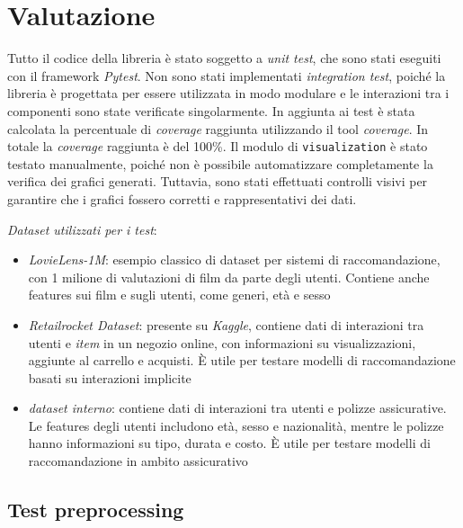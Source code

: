 \chapter{Valutazione}

Tutto il codice della libreria è stato soggetto a \textit{unit test}, che sono stati eseguiti con il framework \textit{Pytest}. Non sono stati implementati \textit{integration test}, poiché la libreria è progettata per essere utilizzata in modo modulare e le interazioni tra i componenti sono state verificate singolarmente. In aggiunta ai test è stata calcolata la percentuale di \textit{coverage} raggiunta utilizzando il tool \textit{coverage}. In totale la \textit{coverage} raggiunta è del 100\%. Il modulo di \texttt{visualization} è stato testato manualmente, poiché non è possibile automatizzare completamente la verifica dei grafici generati. Tuttavia, sono stati effettuati controlli visivi per garantire che i grafici fossero corretti e rappresentativi dei dati.

\textit{Dataset utilizzati per i test}:

\begin{itemize}
    \item \textit{LovieLens-1M}: esempio classico di dataset per sistemi di raccomandazione, con 1 milione di valutazioni di film da parte degli utenti. Contiene anche features sui film e sugli utenti, come generi, età e sesso
    \item \textit{Retailrocket Dataset}: presente su \textit{Kaggle}, contiene dati di interazioni tra utenti e \textit{item} in un negozio online, con informazioni su visualizzazioni, aggiunte al carrello e acquisti. È utile per testare modelli di raccomandazione basati su interazioni implicite
    \item \textit{dataset interno}: contiene dati di interazioni tra utenti e polizze assicurative. Le features degli utenti includono età, sesso e nazionalità, mentre le polizze hanno informazioni su tipo, durata e costo. È utile per testare modelli di raccomandazione in ambito assicurativo
\end{itemize}

\section{Test preprocessing}

